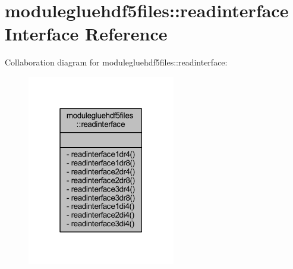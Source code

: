 \hypertarget{interfacemodulegluehdf5files_1_1readinterface}{}\section{modulegluehdf5files\+:\+:readinterface Interface Reference}
\label{interfacemodulegluehdf5files_1_1readinterface}


Collaboration diagram for modulegluehdf5files\+:\+:readinterface\+:\nopagebreak
\begin{figure}[H]
\begin{center}
\leavevmode
\includegraphics[width=183pt]{interfacemodulegluehdf5files_1_1readinterface__coll__graph}
\end{center}
\end{figure}
